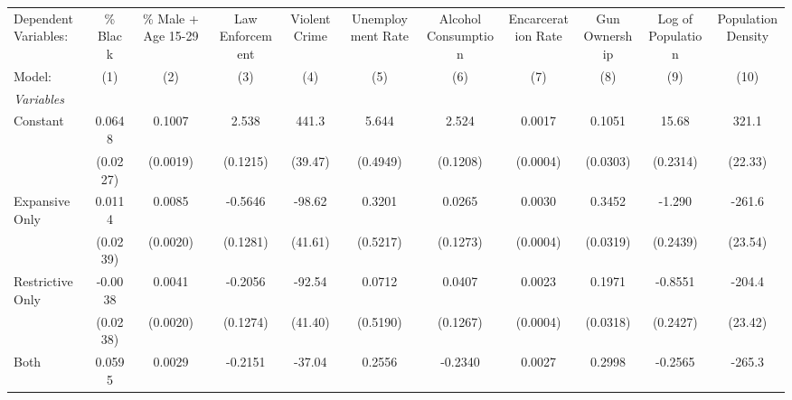 
\begingroup
\centering
\begin{tabular}{lcccccccccc}
   \tabularnewline \midrule \midrule
   Dependent Variables: & \% Black               & \% Male + Age 15-29    & Law Enforcement        & Violent Crime         & Unemployment Rate & Alcohol Consumption    & Encarceration Rate     & Gun Ownership          & Log of Population      & Population Density\\  
   Model:               & (1)                    & (2)                    & (3)                    & (4)                   & (5)               & (6)                    & (7)                    & (8)                    & (9)                    & (10)\\  
   \midrule
   \emph{Variables}\\
   Constant             & 0.0648                 & 0.1007                 & 2.538                  & 441.3                 & 5.644             & 2.524                  & 0.0017                 & 0.1051                 & 15.68                  & 321.1\\   
                        & (0.0227)               & (0.0019)               & (0.1215)               & (39.47)               & (0.4949)          & (0.1208)               & (0.0004)               & (0.0303)               & (0.2314)               & (22.33)\\   
   Expansive Only       & 0.0114                 & 0.0085                 & -0.5646                & -98.62                & 0.3201            & 0.0265                 & 0.0030                 & 0.3452                 & -1.290                 & -261.6\\   
                        & (0.0239)               & (0.0020)               & (0.1281)               & (41.61)               & (0.5217)          & (0.1273)               & (0.0004)               & (0.0319)               & (0.2439)               & (23.54)\\   
   Restrictive Only     & -0.0038                & 0.0041                 & -0.2056                & -92.54                & 0.0712            & 0.0407                 & 0.0023                 & 0.1971                 & -0.8551                & -204.4\\   
                        & (0.0238)               & (0.0020)               & (0.1274)               & (41.40)               & (0.5190)          & (0.1267)               & (0.0004)               & (0.0318)               & (0.2427)               & (23.42)\\   
   Both                 & 0.0595                 & 0.0029                 & -0.2151                & -37.04                & 0.2556            & -0.2340                & 0.0027                 & 0.2998                 & -0.2565                & -265.3\\   

\end{tabular}
